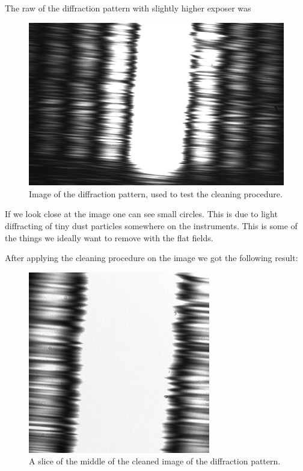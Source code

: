 \documentclass{emulateapj}
\begin{document}
The raw of the diffraction pattern with slightly higher exposer was

\begin{figure}[H]
\centering
\includegraphics[scale=0.2]{3_2.png}
\caption{Image of the diffraction pattern, used to test the cleaning procedure.}
\label{img:rawClean}
\end{figure}

If we look close at the image one can see small circles. This is due to light diffracting of tiny dust particles somewhere on the instruments. This is some of the things we ideally want to remove with the flat fields.

After applying the cleaning procedure on the image we got the following result:

\begin{figure}[H]
\centering
\includegraphics[scale=0.3]{corrected_image.png}
\caption{A slice of the middle of the cleaned image of the diffraction pattern.}
\label{img:slice}
\end{figure}
\end{document}
